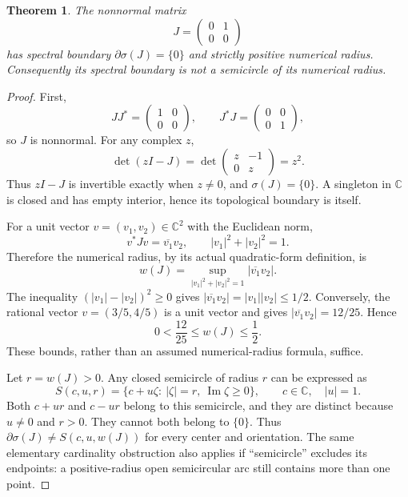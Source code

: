 \documentclass[11pt]{article}
\newtheorem{theorem}{Theorem}
\begin{document}
\begin{theorem}
The nonnormal matrix
\[
                J=\begin{pmatrix}0&1\\0&0\end{pmatrix}
\]
has spectral boundary $\partial\sigma(J)=\{0\}$ and strictly positive
numerical radius. Consequently its spectral boundary is not a semicircle
of its numerical radius.
\end{theorem}
\begin{proof}
First,
\[
 JJ^*=\begin{pmatrix}1&0\\0&0\end{pmatrix},\qquad
 J^*J=\begin{pmatrix}0&0\\0&1\end{pmatrix},
\]
so $J$ is nonnormal. For any complex $z$,
\[
          \det(zI-J)=\det\begin{pmatrix}z&-1\\0&z\end{pmatrix}=z^2.
\]
Thus $zI-J$ is invertible exactly when $z\ne0$, and $\sigma(J)=\{0\}$.
A singleton in $\mathbb C$ is closed and has empty interior, hence its
topological boundary is itself.

For a unit vector $v=(v_1,v_2)\in\mathbb C^2$ with the Euclidean norm,
\[
      v^*Jv=\overline{v_1}v_2,
      \qquad |v_1|^2+|v_2|^2=1.
\]
Therefore the numerical radius, by its actual quadratic-form definition, is
\[
 w(J)=\sup_{|v_1|^2+|v_2|^2=1}|\overline{v_1}v_2|.
\]
The inequality $(|v_1|-|v_2|)^2\geq0$ gives
$|\overline{v_1}v_2|=|v_1||v_2|\leq1/2$. Conversely, the rational vector
$v=(3/5,4/5)$ is a unit vector and gives
$|\overline{v_1}v_2|=12/25$. Hence
\[
                  0<\frac{12}{25}\leq w(J)\leq\frac12.
\]
These bounds, rather than an assumed numerical-radius formula, suffice.

Let $r=w(J)>0$. Any closed semicircle of radius $r$ can be expressed as
\[
 S(c,u,r)=\{c+u\zeta:\ |\zeta|=r,\ \operatorname{Im}\zeta\geq0\},
       \qquad c\in\mathbb C,\quad |u|=1.
\]
Both $c+ur$ and $c-ur$ belong to this semicircle, and they are distinct
because $u\ne0$ and $r>0$. They cannot both belong to $\{0\}$.
Thus $\partial\sigma(J)\ne S(c,u,w(J))$ for every center and orientation.
The same elementary cardinality obstruction also applies if ``semicircle''
excludes its endpoints: a positive-radius open semicircular arc still
contains more than one point.
\end{proof}
\end{document}
